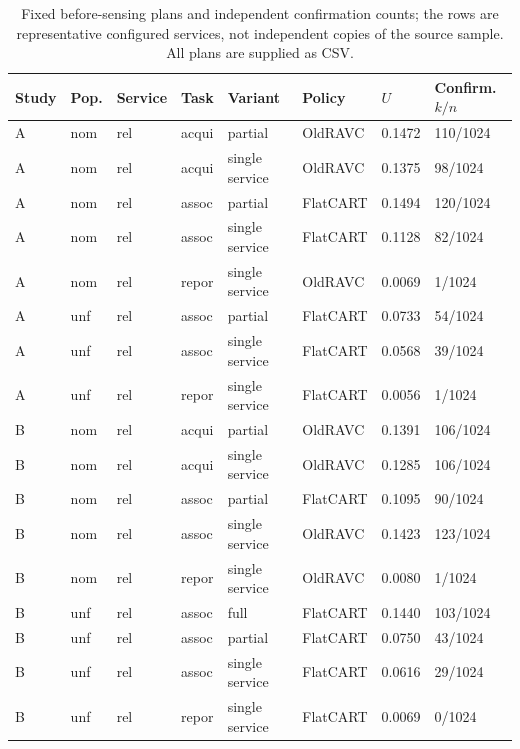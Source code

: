 \begin{table}[!htbp]\centering\small
\caption{Fixed before-sensing plans and independent confirmation counts; the rows are representative configured services, not independent copies of the source sample. All plans are supplied as CSV.}\label{tab:r9-selected}
\begin{tabular}{@{}llllllll@{}}\toprule
Study & Pop. & Service & Task & Variant & Policy & $U$ & Confirm. $k/n$\\\midrule
A & nom & rel & acqui & partial & OldRAVC & 0.1472 & 110/1024\\
A & nom & rel & acqui & single service & OldRAVC & 0.1375 & 98/1024\\
A & nom & rel & assoc & partial & FlatCART & 0.1494 & 120/1024\\
A & nom & rel & assoc & single service & FlatCART & 0.1128 & 82/1024\\
A & nom & rel & repor & single service & OldRAVC & 0.0069 & 1/1024\\
A & unf & rel & assoc & partial & FlatCART & 0.0733 & 54/1024\\
A & unf & rel & assoc & single service & FlatCART & 0.0568 & 39/1024\\
A & unf & rel & repor & single service & FlatCART & 0.0056 & 1/1024\\
B & nom & rel & acqui & partial & OldRAVC & 0.1391 & 106/1024\\
B & nom & rel & acqui & single service & OldRAVC & 0.1285 & 106/1024\\
B & nom & rel & assoc & partial & FlatCART & 0.1095 & 90/1024\\
B & nom & rel & assoc & single service & OldRAVC & 0.1423 & 123/1024\\
B & nom & rel & repor & single service & OldRAVC & 0.0080 & 1/1024\\
B & unf & rel & assoc & full & FlatCART & 0.1440 & 103/1024\\
B & unf & rel & assoc & partial & FlatCART & 0.0750 & 43/1024\\
B & unf & rel & assoc & single service & FlatCART & 0.0616 & 29/1024\\
B & unf & rel & repor & single service & FlatCART & 0.0069 & 0/1024\\
\bottomrule\end{tabular}\end{table}
